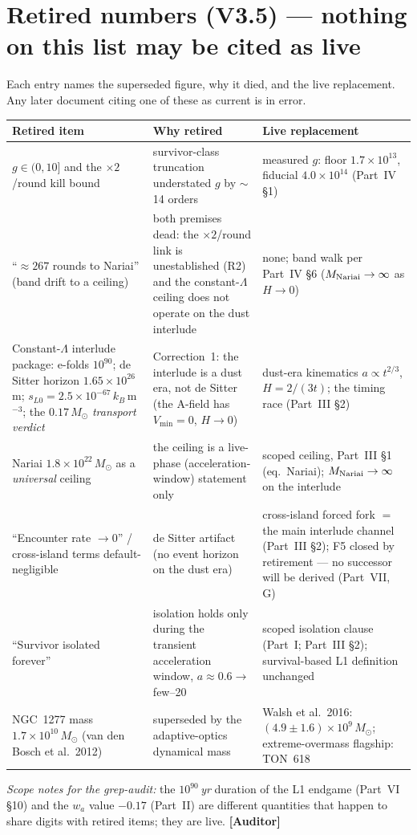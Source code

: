\documentclass[11pt]{article}
\newcommand{\Auditor}{\textbf{\textcolor{teal!55!black}{[Auditor]}}}
\begin{document}
\section{Retired numbers (V3.5) --- nothing on this list may be cited as live}
Each entry names the superseded figure, why it died, and the live replacement. Any later document citing one of these as current is in error.
\begin{center}\small
\begin{tabular}{@{}p{}p{}p{}@{}}\toprule
\textbf{Retired item} & \textbf{Why retired} & \textbf{Live replacement}\\\midrule
$g\in(0,10]$ and the $\times2$/round kill bound & survivor-class truncation understated $g$ by $\sim$14 orders & measured $g$: floor $1.7\times10^{13}$, fiducial $4.0\times10^{14}$ (Part~IV \S1)\\
``$\approx267$ rounds to Nariai'' (band drift to a ceiling) & both premises dead: the $\times2$/round link is unestablished (R2) and the constant-$\Lambda$ ceiling does not operate on the dust interlude & none; band walk per Part~IV \S6 ($M_{\rm Nariai}\to\infty$ as $H\to0$)\\
Constant-$\Lambda$ interlude package: e-folds $10^{90}$; de Sitter horizon $1.65\times10^{26}$\,m; $s_{L0}=2.5\times10^{-67}\,k_B\,$m$^{-3}$; the $0.17\,M_\odot$ \emph{transport verdict} & Correction~1: the interlude is a dust era, not de Sitter (the A-field has $V_{\min}=0$, $H\to0$) & dust-era kinematics $a\propto t^{2/3}$, $H=2/(3t)$; the timing race (Part~III \S2)\\
Nariai $1.8\times10^{22}\,M_\odot$ as a \emph{universal} ceiling & the ceiling is a live-phase (acceleration-window) statement only & scoped ceiling, Part~III \S1 (eq.\ Nariai); $M_{\rm Nariai}\to\infty$ on the interlude\\
``Encounter rate $\to0$'' / cross-island terms default-negligible & de Sitter artifact (no event horizon on the dust era) & cross-island forced fork $=$ the main interlude channel (Part~III \S2); F5 closed by retirement --- no successor will be derived (Part~VII, G)\\
``Survivor isolated forever'' & isolation holds only during the transient acceleration window, $a\approx0.6\to$ few--20 & scoped isolation clause (Part~I; Part~III \S2); survival-based L1 definition unchanged\\
NGC~1277 mass $1.7\times10^{10}\,M_\odot$ (van den Bosch et al.\ 2012) & superseded by the adaptive-optics dynamical mass & Walsh et al.\ 2016: $(4.9\pm1.6)\times10^{9}\,M_\odot$; extreme-overmass flagship: TON~618\\\bottomrule
\end{tabular}\end{center}
\emph{Scope notes for the grep-audit:} the $10^{90}$\,\emph{yr} duration of the L1 endgame (Part~VI \S10) and the $w_a$ value $-0.17$ (Part~II) are different quantities that happen to share digits with retired items; they are live. \Auditor
\end{document}
